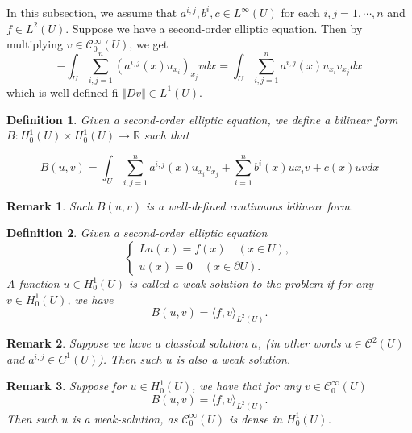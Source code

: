 \documentclass{article}
\newtheorem{definition}{Definition}[section]
\newtheorem{remark}{Remark}[section]
\numberwithin{equation}{section}
\begin{document}
In this subsection, we assume that $a^{i,j},b^i,c\in L^\infty(U)$ for each $i,j=1,\cdots,n$ and $f\in L^2(U)$. Suppose we have a second-order elliptic equation. Then by multiplying $v\in\mathcal{C}^\infty_0(U)$, we get
\begin{equation*}
-\int_U\sum_{i,j=1}^n(a^{i,j}(x)u_{x_i})_{x_j}vdx = \int_U\sum_{i,j=1}^na^{i,j}(x)u_{x_i}v_{x_j}dx
\end{equation*}
which is well-defined fi $\Vert Dv\Vert\in L^1(U)$. 

\begin{definition}
Given a second-order elliptic equation, we define a bilinear form $B:H_0^1(U)\times H_0^1(U)\to\mathbb{R}$ such that

\begin{equation*}
B(u,v) = \int_U\sum_{i,j=1}^na^{i,j}(x)u_{x_i}v_{x_j}+\sum_{i=1}^nb^i(x)u{x_i}v+c(x)uvdx
\end{equation*}
\end{definition}

\begin{remark}
Such $B(u,v)$ is a well-defined continuous bilinear form.
\end{remark}

\begin{definition}
Given a second-order elliptic equation
\begin{equation*}
\begin{cases}
Lu(x) = f(x) \quad (x\in U),\\
u(x) = 0 \quad (x\in \partial U).
\end{cases}
\end{equation*}
A function $u\in H_0^1(U)$ is called a weak solution to the problem if for any $v\in H_0^1(U)$, we have
\begin{equation*}
B(u,v) = \langle f,v\rangle_{L^2(U)}.
\end{equation*}
\end{definition}

\begin{remark}
Suppose we have a classical solution $u$, (in other words $u\in\mathcal{C}^2(U)$ and $a^{i,j}\in C^1(U)$). Then such $u$ is also a weak solution. 
\end{remark}

\begin{remark}
Suppose for $u\in H_0^1(U)$, we have that for any $v\in\mathcal{C}_0^\infty(U)$
\begin{equation*}
B(u,v) = \langle f,v\rangle_{L^2(U)}.
\end{equation*}
Then such $u$ is a weak-solution, as $\mathcal{C}_0^\infty(U)$ is dense in $H_0^1(U)$.
\end{remark}
\end{document}
